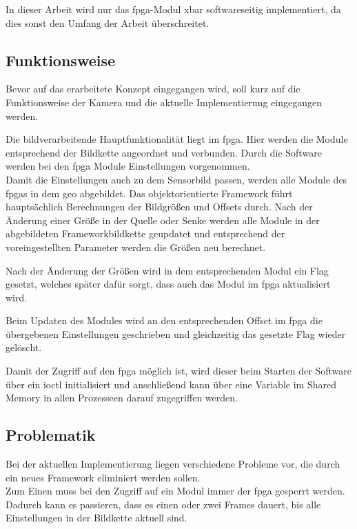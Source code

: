 In dieser Arbeit wird nur das \ac{fpga}-Modul \ac{xbar} softwareseitig implementiert, da dies sonst den Umfang der Arbeit überschreitet. 


\subsection{Funktionsweise}
Bevor auf das erarbeitete Konzept eingegangen wird, soll kurz auf die Funktionsweise der Kamera und die aktuelle Implementierung eingegangen werden.

Die bildverarbeitende Hauptfunktionalität liegt im \ac{fpga}. Hier werden die Module entsprechend der Bildkette angeordnet und verbunden. Durch die Software werden bei den \ac{fpga} Module Einstellungen vorgenommen.\\


Damit die Einstellungen auch zu dem Sensorbild passen, werden alle Module des \ac{fpga}s in dem \ac{geo} abgebildet. Das objektorientierte Framework führt hauptsächlich Berechnungen der Bildgrößen und Offsets durch. Nach der Änderung einer Größe in der Quelle oder Senke werden alle Module in der abgebildeten Frameworkbildkette geupdatet und entsprechend der voreingestellten Parameter werden die Größen neu berechnet. 

Nach der Änderung der Größen wird in dem entsprechenden Modul ein Flag gesetzt, welches später dafür sorgt, dass auch das Modul im \ac{fpga} aktualisiert wird. 

Beim Updaten des Modules wird an den entsprechenden Offset im \ac{fpga} die übergebenen Einstellungen geschrieben und gleichzeitig das gesetzte Flag wieder gelöscht. 

Damit der Zugriff auf den \ac{fpga} möglich ist, wird dieser beim Starten der Software über ein \ac{ioctl} initialisiert und anschließend kann über eine Variable im Shared Memory in allen Prozesseen darauf zugegriffen werden.

\subsection{Problematik}\label{sec:prob}
Bei der aktuellen Implementierung liegen verschiedene Probleme vor, die durch ein neues Framework eliminiert werden sollen.\\

Zum Einen muss bei den Zugriff auf ein Modul immer der \ac{fpga} gesperrt werden. Dadurch kann es passieren, dass es einen oder zwei Frames dauert, bis alle Einstellungen in der Bildkette aktuell sind.\\


